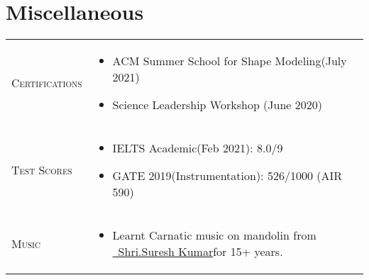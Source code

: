 \documentclass[a4paper,12pt]{article}
\begin{document}
\section{Miscellaneous}
\begin{tabularx}{\linewidth}{@{}l X@{}}
\textsc{Certifications} & \begin{itemize}
    \item ACM Summer School for Shape Modeling(July 2021)
    \item Science Leadership Workshop (June 2020)
\end{itemize}
\\
\textsc{Test Scores}  &  \begin{itemize}
    \item IELTS Academic(Feb 2021): 8.0/9
    \item GATE 2019(Instrumentation): 526/1000 (AIR 590)
\end{itemize}
\\  
\textsc{Music}&
    \begin{itemize}
    \item Learnt Carnatic music on mandolin from \href{https://www.linkedin.com/in/mandolin-suresh-kumar-410577151/?originalSubdomain=in}{\raisebox{-0.05\height}\ Shri.Suresh Kumar}for 15+ years.
\end{itemize}\\
\end{tabularx}
\end{document}
